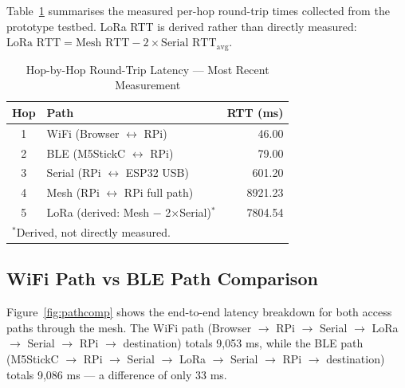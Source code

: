 \documentclass[conference]{IEEEtran}
\begin{document}
Table~\ref{tab:latency} summarises the measured per-hop round-trip times collected from the prototype testbed. LoRa RTT is derived rather than directly measured: $\text{LoRa RTT} = \text{Mesh RTT} - 2 \times \text{Serial RTT}_{\text{avg}}$.

\begin{table}[h]
\centering
\caption{Hop-by-Hop Round-Trip Latency — Most Recent Measurement}
\label{tab:latency}
\begin{tabular}{|c|l|r|}
\hline
\textbf{Hop} & \textbf{Path} & \textbf{RTT (ms)} \\
\hline
1 & WiFi (Browser $\leftrightarrow$ RPi)          &     46.00 \\
2 & BLE (M5StickC $\leftrightarrow$ RPi)          &     79.00 \\
3 & Serial (RPi $\leftrightarrow$ ESP32 USB)       &    601.20 \\
4 & Mesh (RPi $\leftrightarrow$ RPi full path)     &  8921.23 \\
5 & LoRa (derived: Mesh $-$ 2$\times$Serial)$^{*}$ &  7804.54 \\
\hline
\multicolumn{3}{l}{$^{*}$Derived, not directly measured.} \\
\end{tabular}
\end{table}

\subsection{WiFi Path vs BLE Path Comparison}

Figure~\ref{fig:pathcomp} shows the end-to-end latency breakdown for both access paths through the mesh. The WiFi path (Browser $\rightarrow$ RPi $\rightarrow$ Serial $\rightarrow$ LoRa $\rightarrow$ Serial $\rightarrow$ RPi $\rightarrow$ destination) totals 9,053 ms, while the BLE path (M5StickC $\rightarrow$ RPi $\rightarrow$ Serial $\rightarrow$ LoRa $\rightarrow$ Serial $\rightarrow$ RPi $\rightarrow$ destination) totals 9,086 ms — a difference of only 33 ms.
\end{document}

